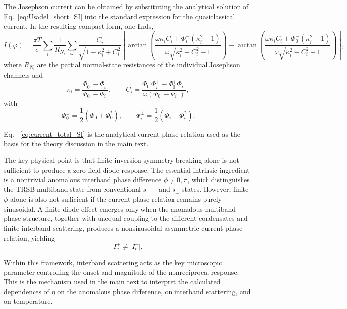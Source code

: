 \documentclass[twocolumn,secnumarabic,amssymb, nobibnotes, aps, prl, superscriptaddress]{revtex4-2}
\begin{document}
The Josephson current can be obtained by substituting the analytical solution of Eq.~\eqref{eq:Usadel_short_SI} into the standard expression for the quasiclassical current. In the resulting compact form, one finds,
\begin{equation}
I(\varphi)
=
\frac{\pi T}{e}
\sum_i \frac{1}{R_{N_i}}
\sum_{\omega}
\frac{C_i}{\sqrt{1-\kappa_i^2+C_i^2}}
\left[
\arctan\!\left(
\frac{\omega \kappa_i C_i + \Phi_i^- (\kappa_i^2-1)}
{\omega \sqrt{\kappa_i^2-C_i^2-1}}
\right)
-
\arctan\!\left(
\frac{\omega \kappa_i C_i + \Phi_0^- (\kappa_i^2-1)}
{\omega \sqrt{\kappa_i^2-C_i^2-1}}
\right)
\right],
\label{eq:current_total_SI}
\end{equation}
where $R_{N_i}$ are the partial normal-state resistances of the individual Josephson channels and
\begin{equation}
\kappa_i=\frac{\Phi_0^+ - \Phi_i^+}{\Phi_0^- - \Phi_i^-},
\qquad
C_i=\frac{\Phi_0^- \Phi_i^+ - \Phi_0^+ \Phi_i^-}
{\omega(\Phi_0^- - \Phi_i^-)},
\label{eq:kappaC_SI}
\end{equation}
with
\begin{equation}
\Phi_0^\pm=\frac{1}{2}\left(\Phi_0\pm \Phi_0^*\right),
\qquad
\Phi_i^\pm=\frac{1}{2}\left(\Phi_i\pm \Phi_i^*\right).
\label{eq:Phi_pm_SI}
\end{equation}

Eq. ~\eqref{eq:current_total_SI} is the analytical current-phase relation used as the basis for the theory discussion in the main text.

The key physical point is that finite inversion-symmetry breaking alone is not sufficient to produce a zero-field diode response. The essential intrinsic ingredient is a nontrivial anomalous interband phase difference $\phi\neq 0,\pi$, which distinguishes the TRSB multiband state from conventional $s_{++}$ and $s_{\pm}$ states. However, finite $\phi$ alone is also not sufficient if the current-phase relation remains purely sinusoidal. A finite diode effect emerges only when the anomalous multiband phase structure, together with unequal coupling to the different condensates and finite interband scattering, produces a nonsinusoidal asymmetric current-phase relation, yielding
\begin{equation}
I_c^+ \neq |I_c^-|.
\end{equation}

Within this framework, interband scattering acts as the key microscopic parameter controlling the onset and magnitude of the nonreciprocal response. This is the mechanism used in the main text to interpret the calculated dependences of $\eta$ on the anomalous phase difference, on interband scattering, and on temperature.
\end{document}
